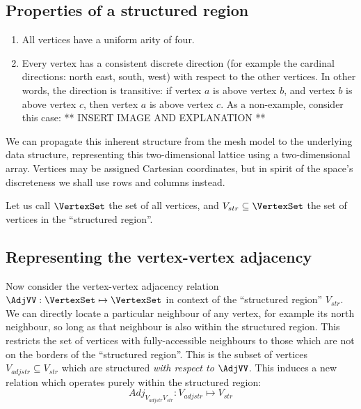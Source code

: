 \subsection{Properties of a structured region}
\label{sec:structured-region-properties}
\begin{enumerate}
\item All vertices have a uniform arity of four.
\item Every vertex has a consistent discrete direction (for example the cardinal directions: north east, south, west) with respect to the other vertices. In other words, the direction is transitive: if vertex $a$ is above vertex $b$, and vertex $b$ is above vertex $c$, then vertex $a$ is above vertex $c$. As a non-example, consider this case:
** INSERT IMAGE AND EXPLANATION **
\end{enumerate}



We can propagate this inherent structure from the mesh model to the underlying data structure, representing this two-dimensional lattice using a two-dimensional array. Vertices may be assigned Cartesian coordinates, but in spirit of the space's discreteness we shall use rows and columns instead.



\newcommand{\strV}{V_{str}}
\newcommand{\adjstrV}{V_{adjstr}}
\newcommand{\AdjVVstr}{Adj_{\adjstrV\strV}}

Let us call $\VertexSet$ the set of all vertices, and $\strV \subseteq \VertexSet$ the set of vertices in the ``structured region''.

\subsection{Representing the vertex-vertex adjacency}

Now consider the vertex-vertex adjacency relation $\AdjVV: \VertexSet \mapsto \VertexSet$ in context of the ``structured region'' $\strV$. We can directly locate a particular neighbour of any vertex, for example its north neighbour, so long as that neighbour is also within the structured region. This restricts the set of vertices with fully-accessible neighbours to those which are not on the borders of the ``structured region''. This is the subset of vertices $\adjstrV \subseteq \strV$ which are structured \emph{with respect to} $\AdjVV$. This induces a new relation which operates purely within the structured region:
$$\AdjVVstr: \adjstrV \mapsto \strV$$

